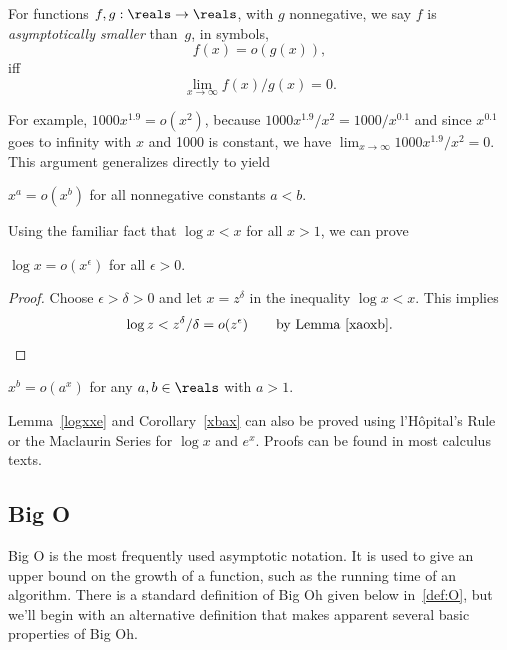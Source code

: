\begin{definition}
  For functions $f,g: \reals \to \reals$, with $g$ nonnegative, we say
  $f$ is%
\emph{asymptotically
    smaller} than~$g$, in symbols,
\[
f(x) = o(g(x)),
\]
iff
\[
\lim_{x \rightarrow \infty} f(x)/g(x) = 0.
\]
\end{definition}

For example, $1000x^{1.9} = o(x^2)$, because $1000x^{1.9}/x^2 =
1000/x^{0.1}$ and since $x^{0.1}$ goes to infinity with $x$ and 1000 is
constant, we have $\lim_{x \rightarrow \infty} 1000x^{1.9}/x^2 = 0$.
This argument generalizes directly to yield
\begin{lemma}\label{xaoxb}
$x^a = o(x^b)$ for all nonnegative constants $a<b$.
\end{lemma}

Using the familiar fact that  $\log x < x$ for all $x >1$, we can prove
\begin{lemma}\label{logxxe}
$\log x = o(x^{\epsilon})$ for all $\epsilon >0$.
\end{lemma}

\begin{proof}
Choose $\epsilon > \delta > 0$ and let $x = z^\delta$ in the inequality
$\log x < x$.  This implies
\begin{equation}\label{zdd}
\log z  <  z^{\delta}/\delta
 =  o(z^{\epsilon})\qquad \text{by Lemma~\ref{xaoxb}}.
\end{equation}
\end{proof}

\begin{corollary}\label{xbax}
$x^b = o(a^x)$ for any $a,b \in \reals$ with $a>1$.
\end{corollary}

Lemma~\ref{logxxe} and Corollary~\ref{xbax} can also be proved using
l'H\^opital's Rule or the Maclaurin Series for $\log x$ and $e^x$.
Proofs can be found in most calculus texts.

\subsection{Big O}

Big O is the most frequently used asymptotic notation.  It is used to
give an upper bound on the growth of a function, such as the running
time of an algorithm.  There is a standard definition of Big Oh given
below in~\ref{def:O}, but we'll begin with an alternative definition
that makes apparent several basic properties of Big Oh.


